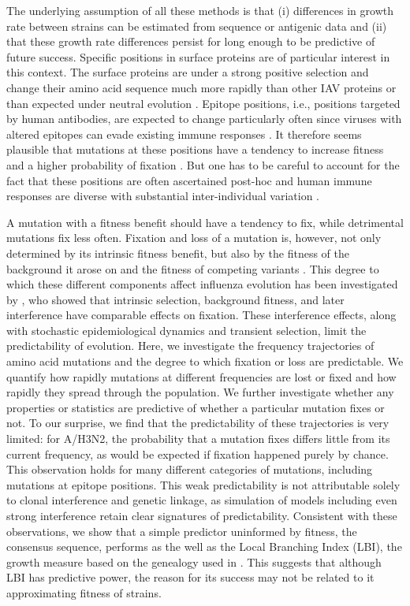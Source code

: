 \documentclass[reprint,amsmath,amssymb,superscriptaddress,showpacs,rmp]{revtex4-1}
\begin{document}
	The underlying assumption of all these methods is that (i) differences in growth rate between strains can be estimated from sequence or antigenic data and (ii) that these growth rate differences persist for long enough to be predictive of future success.
	Specific positions in surface proteins are of particular interest in this context.
	The surface proteins are under a strong positive selection and change their amino acid sequence much more rapidly than other IAV proteins or than expected under neutral evolution \citep{bhatt_genomic_2011,strelkowa_clonal_2012}.
	Epitope positions, i.e., positions targeted by human antibodies, are expected to change particularly often since viruses with altered epitopes can evade existing immune responses \citep{Koel976,wolf_long_2006,Shih6283}.
    It therefore seems plausible that mutations at these positions have a tendency to increase fitness and a higher probability of fixation \citep{strelkowa_clonal_2012}.
    But one has to be careful to account for the fact that these positions are often ascertained post-hoc \citep{Shih6283} and human immune responses are diverse with substantial inter-individual variation
    \citep{lee_mapping_2019}.

	A mutation with a fitness benefit should have a tendency to fix, while detrimental mutations fix less often.
	Fixation and loss of a mutation is, however, not only determined by its intrinsic fitness benefit, but also by the fitness of the background it arose on and the fitness of competing variants \citep{strelkowa_clonal_2012}.
	This degree to which these different components affect influenza evolution has been investigated by \citet{illingworth_components_2012}, who showed that intrinsic selection, background fitness, and later interference have comparable effects on fixation.
	These interference effects, along with stochastic epidemiological dynamics and transient selection, limit the predictability of evolution.
	Here, we investigate the frequency trajectories of amino acid mutations and the degree to which fixation or loss are predictable.
	We quantify how rapidly mutations at different frequencies are lost or fixed and how rapidly they spread through the population.
	We further investigate whether any properties or statistics are predictive of whether a particular mutation fixes or not.
	To our surprise, we find that the predictability of these trajectories is very limited: for A/H3N2, the probability that a mutation fixes differs little from its current frequency, as would be expected if fixation happened purely by chance.
	This observation holds for many different categories of mutations, including mutations at epitope positions.
	This weak predictability is not attributable solely to clonal interference and genetic linkage, as simulation of models including even strong interference retain clear signatures of predictability.
	Consistent with these observations, we show that a simple predictor uninformed by fitness, the consensus sequence, performs as the well as the Local Branching Index (LBI), the growth measure based on the genealogy used in \cite{neher_predicting_2014}.
	This suggests that although LBI has predictive power, the reason for its success may not be related to it approximating fitness of strains.
\end{document}
